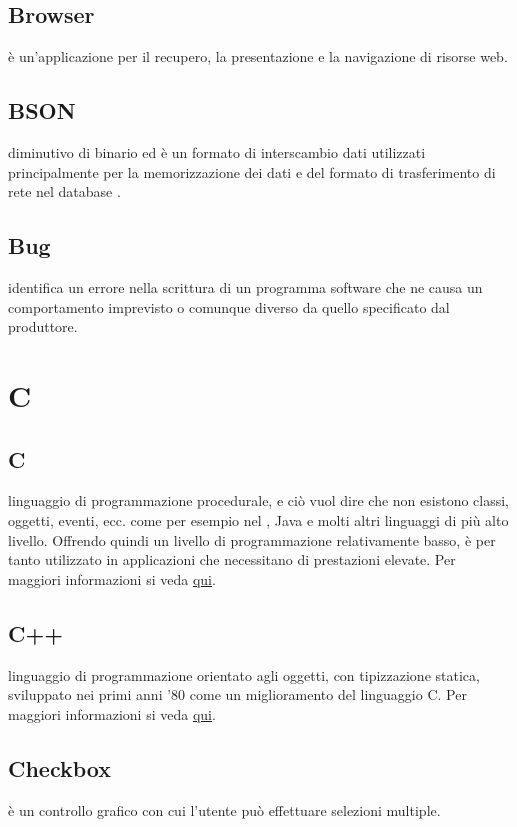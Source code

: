 \documentclass[12pt,a4paper]{article}
\begin{document}
\subsection{Browser}
 è un'applicazione per il recupero, la presentazione e la navigazione di risorse web.

\subsection{BSON}
 diminutivo di  binario ed è un formato di interscambio dati utilizzati principalmente per la memorizzazione dei dati e del formato di trasferimento di rete nel database .

\subsection{Bug}
 identifica un errore nella scrittura di un programma software che ne causa un comportamento imprevisto o comunque diverso da quello specificato dal produttore.

\newpage

\section{C}

\subsection{C}
 linguaggio di programmazione procedurale, e ciò vuol dire che non esistono classi, oggetti, eventi, ecc. come per esempio nel , Java e molti altri linguaggi di più alto livello. Offrendo quindi un livello di programmazione relativamente basso, è per tanto utilizzato in applicazioni che necessitano di prestazioni elevate. Per maggiori informazioni si veda \href{https://it.wikiversity.org/wiki/Linguaggio_C}{qui}.

\subsection{C++}
 linguaggio di programmazione orientato agli oggetti, con tipizzazione statica, sviluppato nei primi anni '80 come un miglioramento del linguaggio C. Per maggiori informazioni si veda \href{https://it.wikiversity.org/wiki/C\%2B\%2B}{qui}.

\subsection{Checkbox}
 è un controllo grafico con cui l'utente può effettuare selezioni multiple.
\end{document}
